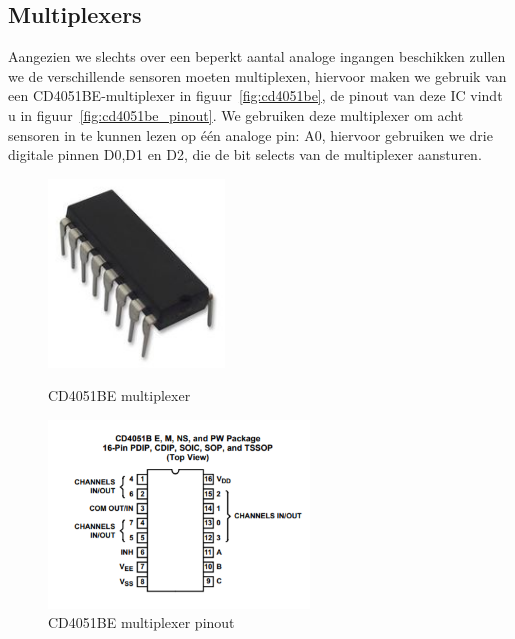\subsection{Multiplexers}
Aangezien we slechts over een beperkt aantal analoge ingangen beschikken zullen we de verschillende sensoren moeten multiplexen, hiervoor maken we gebruik van een CD4051BE-multiplexer in figuur~\vref{fig:cd4051be}, de pinout van deze IC vindt u in figuur~\vref{fig:cd4051be_pinout}. We gebruiken deze multiplexer om acht sensoren in te kunnen lezen op \'e\'en analoge pin: A0, hiervoor gebruiken we drie digitale pinnen D0,D1 en D2, die de bit selects van de multiplexer aansturen.

\begin{figure}[H]
	\centering
	\begin{minipage}[b]{0.4\textwidth}
		\includegraphics[height=5cm]{cd4051be.png}
		\caption{CD4051BE multiplexer}
		\label{fig:cd4051be}
	\end{minipage}
	\hfill
	\begin{minipage}[b]{0.4\textwidth}
		\includegraphics[height=5cm]{cd4051be_pinout.png}
		\caption{CD4051BE multiplexer pinout}
		\label{fig:cd4051be_pinout}
	\end{minipage}
\end{figure}
